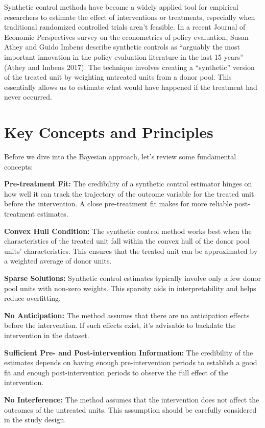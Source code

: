 \documentclass[
  letterpaper,
  DIV=11,
  numbers=noendperiod]{scrreprt}
\begin{document}
Synthetic control methods have become a widely applied tool for
empirical researchers to estimate the effect of interventions or
treatments, especially when traditional randomized controlled trials
aren't feasible. In a recent Journal of Economic Perspectives survey on
the econometrics of policy evaluation, Susan Athey and Guido Imbens
describe synthetic controls as ``arguably the most important innovation
in the policy evaluation literature in the last 15 years'' (Athey and
Imbens 2017). The technique involves creating a ``synthetic'' version of
the treated unit by weighting untreated units from a donor pool. This
essentially allows us to estimate what would have happened if the
treatment had never occurred.

\section{Key Concepts and Principles}\label{key-concepts-and-principles}

Before we dive into the Bayesian approach, let's review some fundamental
concepts:

\textbf{Pre-treatment Fit:} The credibility of a synthetic control
estimator hinges on how well it can track the trajectory of the outcome
variable for the treated unit before the intervention. A close
pre-treatment fit makes for more reliable post-treatment estimates.

\textbf{Convex Hull Condition:} The synthetic control method works best
when the characteristics of the treated unit fall within the convex hull
of the donor pool units' characteristics. This ensures that the treated
unit can be approximated by a weighted average of donor units.

\textbf{Sparse Solutions:} Synthetic control estimates typically involve
only a few donor pool units with non-zero weights. This sparsity aids in
interpretability and helps reduce overfitting.

\textbf{No Anticipation:} The method assumes that there are no
anticipation effects before the intervention. If such effects exist,
it's advisable to backdate the intervention in the dataset.

\textbf{Sufficient Pre- and Post-intervention Information:} The
credibility of the estimates depends on having enough pre-intervention
periods to establish a good fit and enough post-intervention periods to
observe the full effect of the intervention.

\textbf{No Interference:} The method assumes that the intervention does
not affect the outcomes of the untreated units. This assumption should
be carefully considered in the study design.
\end{document}
